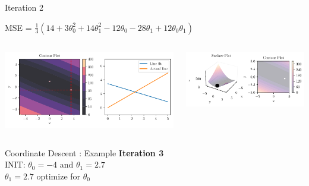 \documentclass{beamer}
\begin{document}
\begin{frame}{Iteration 2}

MSE = $\frac{1}{3}(14+3\theta_{0}^{2}+14\theta_{1}^{2}-12\theta_{0}-28\theta_{1}+12\theta_{0}\theta_{1})$\\

\begin{columns}
\begin{column}{0.6\textwidth}
\begin{adjustbox}{max totalsize={\textwidth},center}
\includegraphics[width=\textwidth]{../../maths/assets/mathematical-ml/figures/gradient-descent-2.pdf}
\end{adjustbox}

\end{column}
\begin{column}{0.5\textwidth}
\begin{adjustbox}{max totalsize={\textwidth},center}
\includegraphics[width=\textwidth]{../../maths/assets/mathematical-ml/figures/contour-linreg-2.pdf}
\end{adjustbox}
\end{column}
\end{columns}


\end{frame}

\begin{frame}{Coordinate Descent : Example}
\textbf{Iteration 3}\\
\vspace{0.5cm}
INIT: $\theta_{0} = -4$ and $\theta_{1}  = 2.7$\\

\vspace{0.5cm}
$\theta_1 = 2.7$ optimize for $\theta_{0}$\\ 


\end{frame}
\end{document}
